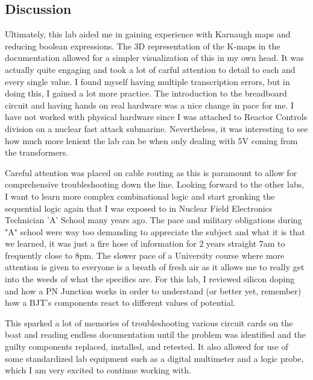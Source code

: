 \documentclass[12pt]{report}
\begin{document}
\subsection*{Discussion}
Ultimately, this lab aided me in gaining experience with Karnaugh maps and reducing boolean expressions. The 3D representation of the K-maps in the documentation allowed for a simpler visualization of this in my own head. It was actually quite engaging and took a lot of carful attention to detail to each and every single value. I found myself having multiple transcription errors, but in doing this, I gained a lot more practice. The introduction to the breadboard circuit and having hands on real hardware was a nice change in pace for me. I have not worked with physical hardware since I was attached to Reactor Controls division on a nuclear fast attack submarine. Nevertheless, it was interesting to see how much more lenient the lab can be when only dealing with 5V coming from the transformers. 

Careful attention was placed on cable routing as this is paramount to allow for comprehensive troubleshooting down the line. Looking forward to the other labs, I want to learn more complex combinational logic and start gronking the sequential logic again that I was exposed to in Nuclear Field Electronics Technician 'A' School many years ago. The pace and military obligations during "A" school were way too demanding to appreciate the subject and what it is that we learned, it was just a fire hose of information for 2 years straight 7am to frequently close to 8pm. The slower pace of a University course where more attention is given to everyone is a breath of fresh air as it allows me to really get into the weeds of what the specifics are. For this lab, I reviewed silicon doping and how a PN Junction works in order to understand (or better yet, remember) how a BJT's components react to different values of potential. 

This sparked a lot of memories of troubleshooting various circuit cards on the boat and reading endless documentation until the problem was identified and the guilty components replaced, installed, and retested. It also allowed for use of some standardized lab equipment such as a digital multimeter and a logic probe, which I am very excited to continue working with.

\newpage
\end{document}
